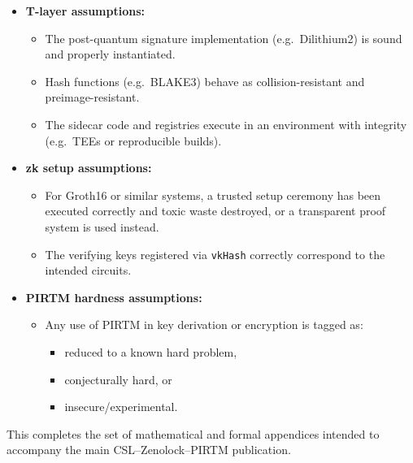 \documentclass[11pt]{article}
\begin{document}
\begin{itemize}[leftmargin=*]
  \item \textbf{T-layer assumptions:}
    \begin{itemize}
      \item The post-quantum signature implementation (e.g.~Dilithium2) is sound and properly instantiated.
      \item Hash functions (e.g.~BLAKE3) behave as collision-resistant and preimage-resistant.
      \item The sidecar code and registries execute in an environment with integrity (e.g.~TEEs or reproducible builds).
    \end{itemize}
  \item \textbf{zk setup assumptions:}
    \begin{itemize}
      \item For Groth16 or similar systems, a trusted setup ceremony has been executed correctly and toxic waste destroyed,
            or a transparent proof system is used instead.
      \item The verifying keys registered via \texttt{vkHash} correctly correspond to the intended circuits.
    \end{itemize}
  \item \textbf{PIRTM hardness assumptions:}
    \begin{itemize}
      \item Any use of PIRTM in key derivation or encryption is tagged as:
        \begin{itemize}
          \item reduced to a known hard problem,
          \item conjecturally hard, or
          \item insecure/experimental.
        \end{itemize}
    \end{itemize}
\end{itemize}

This completes the set of mathematical and formal appendices intended to accompany the main CSL--Zenolock--PIRTM publication.

\nocite{*}
  

\end{document}
